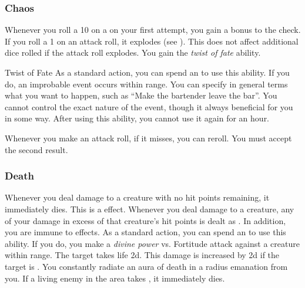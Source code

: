         \subsubsection{Chaos}
             Whenever you roll a 10 on a  on your first attempt, you gain a  bonus to the check.
             If you roll a 1 on an attack roll, it explodes (see ).
            This does not affect additional dice rolled if the attack roll explodes.
             You gain the \textit{twist of fate} ability.
            \begin{ability}{Twist of Fate}
                As a standard action, you can spend an  to use this ability.
                If you do, an improbable event occurs within \rnglong range.
                You can specify in general terms what you want to happen, such as ``Make the bartender leave the bar''.
                You cannot control the exact nature of the event, though it always beneficial for you in some way.
                After using this ability, you cannot use it again for an hour.
            \end{ability}
             Whenever you make an attack roll, if it misses, you can reroll.
            You must accept the second result.

        \subsubsection{Death}
             Whenever you deal damage to a creature with no hit points remaining, it immediately dies.
            This is a  effect.
             Whenever you deal damage to a creature, any of your damage in excess of that creature's hit points is dealt as .
            In addition, you are immune to  effects.
             As a standard action, you can spend an  to use this ability.
            If you do, you make a \textit{divine power} vs. Fortitude attack against a creature within \rngmed range.
            \hit The target takes life  \plus2d.
            This damage is increased by \plus2d if the target is .
             You constantly radiate an aura of death in a \areahuge radius emanation from you.
            If a living enemy in the area takes , it immediately dies.

